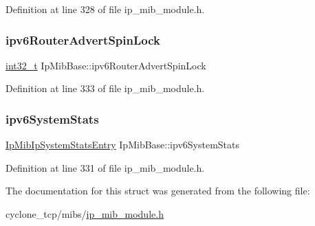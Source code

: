 Definition at line 328 of file ip\+\_\+mib\+\_\+module.\+h.

\mbox{\label{structIpMibBase_a6c51a0cf2c844688ec67bf89553ad0c9}} 
\subsubsection{\texorpdfstring{ipv6\+Router\+Advert\+Spin\+Lock}{ipv6RouterAdvertSpinLock}}
{\footnotesize\ttfamily \hyperlink{stdint_8h_ab1967d8591af1a4e48c37fd2b0f184d0}{int32\+\_\+t} Ip\+Mib\+Base\+::ipv6\+Router\+Advert\+Spin\+Lock}



Definition at line 333 of file ip\+\_\+mib\+\_\+module.\+h.

\mbox{\label{structIpMibBase_a016a7acc776e442238209233f60eb339}} 
\subsubsection{\texorpdfstring{ipv6\+System\+Stats}{ipv6SystemStats}}
{\footnotesize\ttfamily \hyperlink{structIpMibIpSystemStatsEntry}{Ip\+Mib\+Ip\+System\+Stats\+Entry} Ip\+Mib\+Base\+::ipv6\+System\+Stats}



Definition at line 331 of file ip\+\_\+mib\+\_\+module.\+h.



The documentation for this struct was generated from the following file\+:\begin{DoxyCompactItemize}
\item 
cyclone\+\_\+tcp/mibs/\hyperlink{ip__mib__module_8h}{ip\+\_\+mib\+\_\+module.\+h}\end{DoxyCompactItemize}
